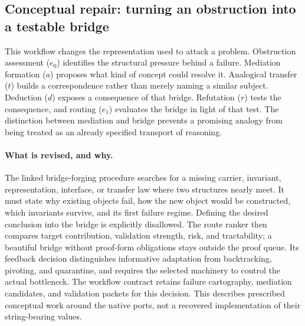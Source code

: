 

\subsection{Conceptual repair: turning an obstruction into a testable bridge}
\label{app:granular-conceptual-hypothesis-exploration-loop}
This workflow changes the representation used to attack a problem. Obstruction
assessment ($e_0$) identifies the structural pressure behind a failure. Mediation
formation ($a$) proposes what kind of concept could resolve it. Analogical
transfer ($t$) builds a correspondence rather than merely naming a similar
subject. Deduction ($d$) exposes a consequence of that bridge. Refutation ($r$)
tests the consequence, and routing ($e_1$) evaluates the bridge in light of that
test. The distinction between mediation and bridge prevents a promising analogy
from being treated as an already specified transport of reasoning.

\paragraph{What is revised, and why.}
The linked bridge-forging procedure searches for a missing carrier, invariant,
representation, interface, or transfer law where two structures nearly meet.
It must state why existing objects fail, how the new object would be constructed,
which invariants survive, and its first failure regime. Defining the desired
conclusion into the bridge is explicitly disallowed. The route ranker then
compares target contribution, validation strength, risk, and tractability; a
beautiful bridge without proof-form obligations stays outside the proof queue.
Its feedback decision distinguishes informative adaptation from backtracking,
pivoting, and quarantine, and requires the selected machinery to control the
actual bottleneck. The workflow contract retains failure cartography, mediation
candidates, and validation packets for this decision. This describes prescribed
conceptual work around the native ports, not a recovered implementation of their
string-bearing values.

